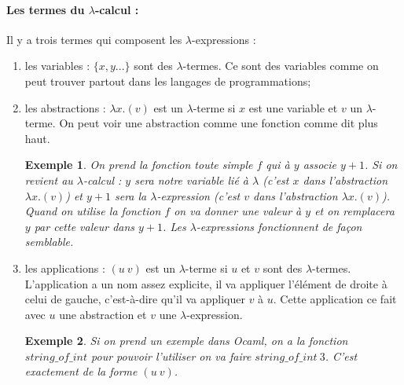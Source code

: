 \documentclass[10pt,a4paper]{report}
\newtheorem{ex}{Exemple}
\begin{document}
	\paragraph{Les termes du $\lambda$-calcul :}
	Il y a trois termes qui composent les $\lambda$-expressions :
	\begin{enumerate}
		\item les variables : $\{x, y...\}$ sont des $\lambda$-termes. Ce sont des variables comme on peut trouver partout dans les langages de programmations; 
		\item les abstractions : $\lambda x.(v)$ est un $\lambda$-terme si $x$ est une variable et $v$ un $\lambda$-terme. On peut voir une abstraction comme une fonction comme dit plus haut.
		\begin{ex}
			On prend la fonction toute simple $f$ qui à $y$ associe $y+1$. Si on revient au $\lambda$-calcul : $y$ sera notre variable lié à $\lambda$ (c'est $x$ dans l'abstraction $\lambda x.(v)$) et $y+1$ sera la $\lambda$-expression (c'est $v$ dans l'abstraction $\lambda x.(v)$). Quand on utilise la fonction $f$ on va donner une valeur à $y$ et on remplacera $y$ par cette valeur dans $y+1$. Les $\lambda$-expressions fonctionnent de façon semblable.
		\end{ex}
		\item les applications : $(u~v)$ est un $\lambda$-terme si $u$ et $v$ sont des $\lambda$-termes. L'application a un nom assez explicite, il va appliquer l'élément de droite à celui de gauche, c'est-à-dire qu'il va appliquer $v$ à $u$. Cette application ce fait avec $u$ une abstraction et $v$ une $\lambda$-expression. 
		\begin{ex}
			Si on prend un exemple dans Ocaml, on a la fonction $string\_of\_int$ pour pouvoir l'utiliser on va faire $string\_of\_int~3$. C'est exactement de la forme $(u~v)$.  
		\end{ex}
	\end{enumerate}
	\bigbreak
	
\end{document}
